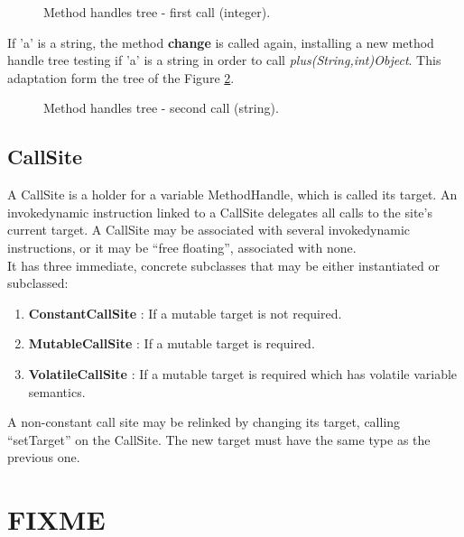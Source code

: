 \documentclass{sig-alternate}
\begin{document}
      \begin{figure}[!h]
		\hspace{-.6in} \resizebox{1.3\linewidth}{!}{}
        \caption{Method handles tree - first call (integer).}
        \label{ast2}
      \end{figure}

      If 'a' is a string, the method {\bf change} is called again,
      installing a new method handle tree testing if 'a' is a string in order to call {\it plus(String,int)Object}.
      This adaptation form the tree of the Figure \ref{ast3}.

      \begin{figure}
        \centering \resizebox{.9\linewidth}{!}{}
        \caption{Method handles tree - second call (string).}
        \label{ast3}
      \end{figure}

    \subsection{CallSite}

      A CallSite is a holder for a variable MethodHandle, which is called its target.
      An invokedynamic instruction linked to a CallSite delegates all calls to the site's current target.
      A CallSite may be associated with several invokedynamic instructions,
      or it may be ``free floating'', associated with none.\\

      It has three immediate, concrete subclasses that may be either instantiated or subclassed:
      \begin{enumerate}
        \item \textbf{ConstantCallSite} : If a mutable target is not required.
        \item \textbf{MutableCallSite}  : If a mutable target is required.
        \item \textbf{VolatileCallSite} : If a mutable target is required which has volatile variable semantics.
      \end{enumerate}
      A non-constant call site may be relinked by changing its target, calling ``setTarget'' on the CallSite.
      The new target must have the same type as the previous one.

\section{FIXME}
\end{document}
